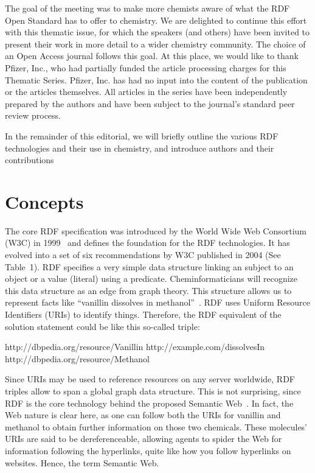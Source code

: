 \documentclass[10pt]{bmc_article}
\newenvironment{bmcformat}{\begin{raggedright}\baselineskip20pt\sloppy\setboolean{publ}{false}}{\end{raggedright}\baselineskip20pt\sloppy}
\begin{document}
\begin{bmcformat}
The goal of the meeting was to make more chemists aware of what the RDF Open
Standard has to offer to chemistry. We are delighted to continue this effort
with this thematic issue, for which the speakers (and others) have been invited
to present their work in more detail to a wider chemistry community. The choice
of an Open Access journal follows this goal. At this place, we would like to thank Pfizer, Inc., 
who had partially funded the article processing charges for this Thematic Series.
Pfizer, Inc. has had no input into the content of the publication or the articles themselves.
All articles in the series have been independently prepared by the authors and
have been subject to the journal's standard peer review process.

In the remainder of this editorial, we will briefly outline the various RDF
technologies and their use in chemistry, and introduce authors and their
contributions  

\section{Concepts}

The core RDF specification was introduced by the World Wide Web Consortium (W3C)
in 1999~\cite{Lassila1999} and defines the foundation for the RDF technologies. It has
evolved into a set of six recommendations by W3C published in 2004
(See Table~1). 
RDF specifies a very simple data structure linking an subject to an object or a
value (literal) using a predicate. Cheminformaticians will recognize this data
structure as an edge from graph theory. This structure allows us to represent
facts like ``vanillin dissolves in methanol''~\cite{ONS2010}. RDF uses Uniform
Resource Identifiers (URIs) to identify things. Therefore, the RDF equivalent of
the solution statement could be like this so-called triple:

http://dbpedia.org/resource/Vanillin http://example.com/dissolvesIn http://dbpedia.org/resource/Methanol

Since URIs may be used to reference resources on any server worldwide, RDF triples allow to span a global graph data structure. 
This is not surprising, since RDF is the core technology behind the proposed Semantic Web~\cite{BER2001}. In fact, the Web
nature is clear here, as one can follow both the URIs for vanillin and methanol to
obtain further information on those two chemicals. These molecules' URIs are said to be
dereferenceable, allowing agents to spider the Web for information following
the hyperlinks, quite like how you follow hyperlinks on websites. Hence, the term Semantic Web.


\end{bmcformat}
\end{document}
